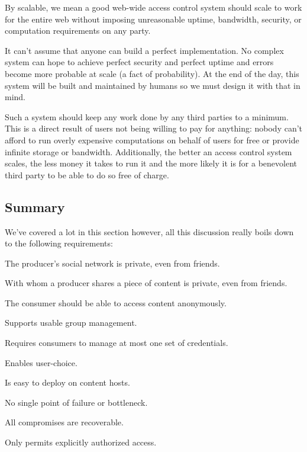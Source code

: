 \documentclass[pdftex,12pt,a4papaer,twoside,notitlepage]{report}
\begin{document}
By scalable, we mean a good web-wide access control system should scale to work
for the entire web without imposing unreasonable uptime, bandwidth, security, or
computation requirements on any party.

It can't assume that anyone can build a perfect implementation. No complex
system can hope to achieve perfect security and perfect uptime and errors become
more probable at scale (a fact of probability). At the end of the day, this
system will be built and maintained by humans so we must design it with that in
mind.

Such a system should keep any work done by any third parties to a minimum. This
is a direct result of users not being willing to pay for anything: nobody can't
afford to run overly expensive computations on behalf of users for free or
provide infinite storage or bandwidth. Additionally, the better an access
control system scales, the less money it takes to run it and the more likely it
is for a benevolent third party to be able to do so free of charge.


\subsection{Summary}

We've covered a lot in this section however, all this discussion really boils
down to the following requirements:

\begin{compactenum}
\item The producer's social network is private, even from friends.
\item With whom a producer shares a piece of content is private, even from friends.
\item The consumer should be able to access content anonymously.
  \vspace{1em}
\item Supports usable group management.
\item Requires consumers to manage at most one set of credentials.
\item Enables user-choice.
\item Is easy to deploy on content hosts.
  \vspace{1em}
\item No single point of failure or bottleneck.
\item All compromises are recoverable.
\item Only permits explicitly authorized access.
\end{compactenum}
\end{document}
